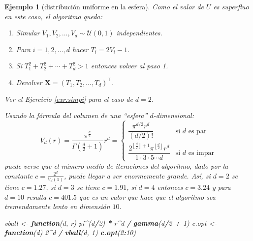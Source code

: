 \documentclass[
  spanish,
  10pt,
]{book}
\newenvironment{Shaded}{\begin{snugshade}}{\end{snugshade}}
\newcommand{\ControlFlowTok}[1]{\textcolor[rgb]{0.13,0.29,0.53}{\textbf{#1}}}
\newcommand{\DecValTok}[1]{\textcolor[rgb]{0.00,0.00,0.81}{#1}}
\newcommand{\FunctionTok}[1]{\textcolor[rgb]{0.13,0.29,0.53}{\textbf{#1}}}
\newcommand{\NormalTok}[1]{#1}
\newcommand{\OtherTok}[1]{\textcolor[rgb]{0.56,0.35,0.01}{#1}}
\newcommand{\SpecialCharTok}[1]{\textcolor[rgb]{0.81,0.36,0.00}{\textbf{#1}}}
\renewcommand{\mathbf}[1]{\symbf{#1}}
\theoremstyle{break}
\newtheorem{example}{Ejemplo}[chapter]
\theoremstyle{nonumberplain}
\begin{document}
\begin{example}[distribución uniforme en la esfera]
Como el valor de \(U\) es superfluo en este caso, el algoritmo queda:

\begin{enumerate}
\def\labelenumi{\arabic{enumi}.}
\item
  Simular \(V_1, V_2, \ldots, V_d \sim \mathcal{U}(0,1)\) independientes.
\item
  Para \(i = 1, 2, \ldots, d\) hacer \(T_i = 2V_i - 1\).
\item
  Si \(T_1^2 + T_2^2 + \cdots + T_d^2 > 1\) entonces volver al paso 1.
\item
  Devolver \(\mathbf{X} = \left( T_1, T_2, \ldots, T_d \right)^{\top}\).
\end{enumerate}

Ver el Ejercicio \ref{exr:simpi} para el caso de \(d=2\).

Usando la fórmula del volumen de una ``esfera'' \(d\)-dimensional:
\[V_d (r) = \frac{\pi^\frac{d}{2}}{\Gamma\left(\frac{d}{2} + 1\right)}r^d= \left\{
\begin{array}{ll}
\dfrac{\pi^{d/2}r^d}{\left( d/2\right)  !} & \text{si } d \text{ es par}\\
\dfrac{2^{\left\lfloor \frac{d}{2}\right\rfloor +1}\pi^{\left\lfloor \frac{d}{2}\right\rfloor }r^d}{1\cdot3\cdot5\cdots d} & \text{si } d \text{ es impar}
\end{array}\right.\]
puede verse que el número medio de iteraciones del algoritmo, dado por la constante \(c = \frac{2^d}{V_d (1)}\), puede llegar a ser enormemente grande.
Así, si \(d=2\) se tiene \(c=1.27\), si \(d=3\) se tiene \(c=1.91\), si \(d=4\) entonces \(c=3.24\) y para \(d=10\) resulta \(c=401.5\) que es un valor que hace que el algoritmo sea tremendamente lento en dimensión \(10\).

\begin{Shaded}
\begin{Highlighting}[]
\NormalTok{vball }\OtherTok{\textless{}{-}} \ControlFlowTok{function}\NormalTok{(d, r) pi}\SpecialCharTok{\^{}}\NormalTok{(d}\SpecialCharTok{/}\DecValTok{2}\NormalTok{) }\SpecialCharTok{*}\NormalTok{ r}\SpecialCharTok{\^{}}\NormalTok{d }\SpecialCharTok{/} \FunctionTok{gamma}\NormalTok{(d}\SpecialCharTok{/}\DecValTok{2} \SpecialCharTok{+} \DecValTok{1}\NormalTok{)}
\NormalTok{c.opt }\OtherTok{\textless{}{-}} \ControlFlowTok{function}\NormalTok{(d) }\DecValTok{2}\SpecialCharTok{\^{}}\NormalTok{d }\SpecialCharTok{/} \FunctionTok{vball}\NormalTok{(d, }\DecValTok{1}\NormalTok{)}
\FunctionTok{c.opt}\NormalTok{(}\DecValTok{2}\SpecialCharTok{:}\DecValTok{10}\NormalTok{)}
\end{Highlighting}
\end{Shaded}


\end{example}
\end{document}
